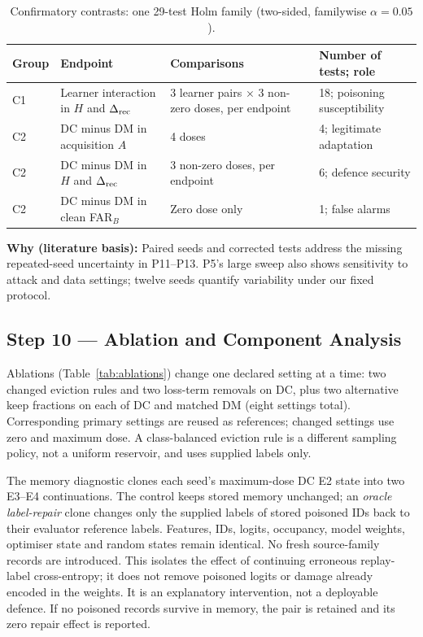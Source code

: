 \documentclass[10pt,a4paper]{article}
\newcommand{\why}[1]{\par\nopagebreak[4]\noindent\colorbox{black!5}{\parbox{\dimexpr\linewidth-2\fboxsep}{\small\textbf{Why (literature basis):} #1}}\par}
\begin{document}
\begin{table}[H]
\centering\footnotesize
\caption{Confirmatory contrasts: one 29-test Holm family (two-sided, familywise $\alpha=0.05$).}
\label{tab:hypotheses}
\begin{tabularx}{\linewidth}{L{1.0cm}Y Y L{2.6cm}}
\toprule
Group & Endpoint & Comparisons & Number of tests; role\\
\midrule
C1 & Learner interaction in $H$ and $\Delta_{\rm rec}$ & 3 learner pairs $\times$ 3 non-zero doses, per endpoint & 18; poisoning susceptibility\\
C2 & DC minus DM in acquisition $A$ & 4 doses & 4; legitimate adaptation\\
C2 & DC minus DM in $H$ and $\Delta_{\rm rec}$ & 3 non-zero doses, per endpoint & 6; defence security\\
C2 & DC minus DM in clean FAR$_B$ & Zero dose only & 1; false alarms\\
\bottomrule
\end{tabularx}
\end{table}

\why{Paired seeds and corrected tests address the missing repeated-seed uncertainty in P11--P13. P5's large sweep also shows sensitivity to attack and data settings; twelve seeds quantify variability under our fixed protocol.}

\subsection{Step 10 --- Ablation and Component Analysis}
Ablations (Table~\ref{tab:ablations}) change one declared setting at a time: two changed eviction rules and two loss-term removals on DC, plus two alternative keep fractions on each of DC and matched DM (eight settings total). Corresponding primary settings are reused as references; changed settings use zero and maximum dose. A class-balanced eviction rule is a different sampling policy, not a uniform reservoir, and uses supplied labels only.

The memory diagnostic clones each seed's maximum-dose DC E2 state into two E3--E4 continuations. The control keeps stored memory unchanged; an \emph{oracle label-repair} clone changes only the supplied labels of stored poisoned IDs back to their evaluator reference labels. Features, IDs, logits, occupancy, model weights, optimiser state and random states remain identical. No fresh source-family records are introduced. This isolates the effect of continuing erroneous replay-label cross-entropy; it does not remove poisoned logits or damage already encoded in the weights. It is an explanatory intervention, not a deployable defence. If no poisoned records survive in memory, the pair is retained and its zero repair effect is reported.
\end{document}
